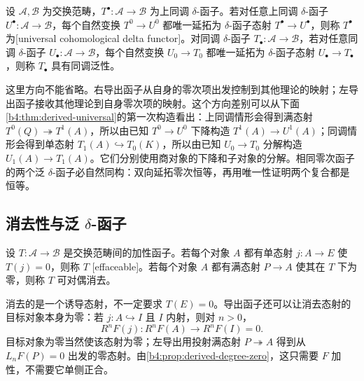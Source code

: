 \begin{definition}\label{b4:def:universal-delta-functor}
	设 \(\mathcal A,\mathcal B\) 为交换范畴，\(T^\bullet:\mathcal A\to\mathcal B\) 为上同调 \(\delta\)-函子。若对任意上同调 \(\delta\)-函子 \(U^\bullet:\mathcal A\to\mathcal B\)，每个自然变换 \(T^0\to U^0\) 都唯一延拓为 \(\delta\)-函子态射 \(T^\bullet\to U^\bullet\)，则称 \(T^\bullet\) 为[universal cohomological delta functor]。对同调 \(\delta\)-函子 \(T_\bullet:\mathcal A\to\mathcal B\)，若对任意同调 \(\delta\)-函子 \(U_\bullet:\mathcal A\to\mathcal B\)，每个自然变换 \(U_0\to T_0\) 都唯一延拓为 \(\delta\)-函子态射 \(U_\bullet\to T_\bullet\)，则称 \(T_\bullet\) 具有同调泛性。
\end{definition}

这里方向不能省略。右导出函子从自身的零次项出发控制到其他理论的映射；左导出函子接收其他理论到自身零次项的映射。这个方向差别可以从下面\cref{b4:thm:derived-universal}的第一次构造看出：上同调情形会得到满态射 \(T^0(Q)\twoheadrightarrow T^1(A)\)，所以由已知 \(T^0\to U^0\) 下降构造 \(T^1(A)\to U^1(A)\)；同调情形会得到单态射 \(T_1(A)\hookrightarrow T_0(K)\)，所以由已知 \(U_0\to T_0\) 分解构造 \(U_1(A)\to T_1(A)\)。它们分别使用商对象的下降和子对象的分解。相同零次函子的两个泛 \(\delta\)-函子必自然同构：双向延拓零次恒等，再用唯一性证明两个复合都是恒等。

\subsection{\texorpdfstring{消去性与泛 \(\delta\)-函子}{消去性与泛 \AlgebraPdfDelta-函子}}
\label{b4:subsec:0801:03}

\begin{definition}\label{b4:def:effaceable}
	设 \(T:\mathcal A\to\mathcal B\) 是交换范畴间的加性函子。若每个对象 \(A\) 都有单态射 \(j:A\to E\) 使 \(T(j)=0\)，则称 \(T\) [effaceable]。若每个对象 \(A\) 都有满态射 \(P\to A\) 使其在 \(T\) 下为零，则称 \(T\) 可对偶消去。
\end{definition}

消去的是一个诱导态射，不一定要求 \(T(E)=0\)。导出函子还可以让消去态射的目标对象本身为零：若 \(j:A\hookrightarrow I\) 且 \(I\) 内射，则对 \(n>0\)，
\[
	R^nF(j):R^nF(A)\longrightarrow R^nF(I)=0.
\]
目标对象为零当然使该态射为零；左导出用投射满态射 \(P\twoheadrightarrow A\) 得到从 \(L_nF(P)=0\) 出发的零态射。由\cref{b4:prop:derived-degree-zero}，这只需要 \(F\) 加性，不需要它单侧正合。

